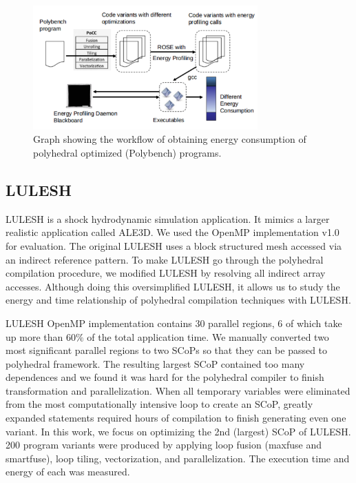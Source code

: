 \begin{figure}[t]
    \includegraphics[width=3.4in]{workflow}
    \caption{Graph showing the workflow of obtaining energy consumption of polyhedral
optimized (Polybench) programs. }
    \label{fig:Workflow}
\end{figure}

\subsection{LULESH}
LULESH\cite{LULESH:versions} is a shock hydrodynamic simulation application. It
mimics a larger realistic application called ALE3D. We used the OpenMP implementation
v1.0 for evaluation. The original LULESH uses a 
block structured mesh accessed via an indirect reference pattern\cite{LULESH:versions}.
To make LULESH go through the polyhedral compilation procedure, we modified
LULESH by resolving all indirect array accesses. Although doing this oversimplified
LULESH, it allows us to study the energy and time relationship of polyhedral 
compilation techniques with LULESH. 

LULESH OpenMP implementation contains 30 parallel regions, 6 of which take up more
than $60\%$ of the total application time\cite{us}. We manually converted two most 
significant parallel regions to two SCoPs so that they can be passed to polyhedral
framework. The resulting largest SCoP contained too many dependences and we found
it was hard for the polyhedral compiler to finish transformation and parallelization.
When all temporary variables were eliminated from the most computationally intensive loop
to create an SCoP, greatly expanded statements required hours of compilation to finish generating even one variant.
In this work, we focus on optimizing 
the 2nd (largest) SCoP of LULESH. 200 program variants were produced 
by applying loop fusion (maxfuse and 
smartfuse), loop tiling, vectorization, and parallelization.
The execution time and energy of each was measured.

